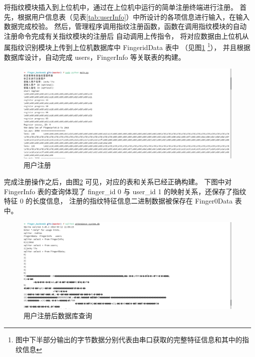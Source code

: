     将指纹模块插入到上位机中，通过在上位机中运行的简单注册终端进行注册。
    首先，根据用户信息表（见表\ref{tab:userInfo}）中所设计的各项信息进行输入，在输入数据完成校验。
    然后，管理程序调用指纹注册函数，函数在调用指纹模块的自动注册命令完成有关指纹模块的注册后
    自动调用上传指令，
    将对应数据由上位机从属指纹识别模块上传到上位机数据库中 Finger{id}Data 表中
    （见图\ref{test::用户注册} \footnote{图中下半部分输出的字节数据分别代表由串口获取的完整特征信息和其中的指纹信息}），
    并且根据数据库设计，自动完成 users，FingerInfo 等关联表的构建。

    \begin{figure}[ht]
        \centering
        \caption{用户注册}    \label{test::用户注册} 
        \includegraphics[width=\textwidth]{./imgs/测试-用户注册.png}
    \end{figure}   

    完成注册操作之后，由图\ref{test::注册后数据库查询} 可见，对应的表和关系已经正确构建。
    下图中对 FingerInfo 表的查询体现了 finger\_id 0 与 user\_id 1 的映射关系，还保存了指纹特征 0 的长度信息，
    注册的指纹特征信息二进制数据被保存在 Finger0Data 表中。

    \begin{figure}[ht]
        \centering
        \caption{用户注册后数据库查询}    \label{test::注册后数据库查询}
        \includegraphics[width=\textwidth]{./imgs/测试-注册后数据库查询.png}
    \end{figure}   

